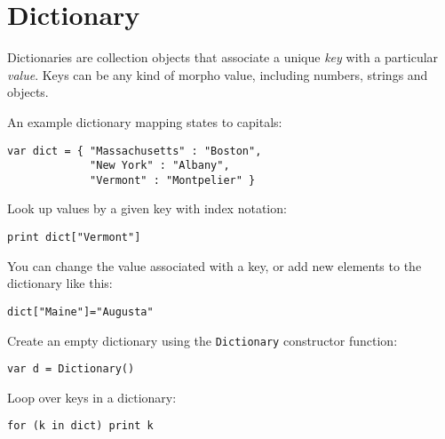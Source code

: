 \hypertarget{dictionary}{%
\section{Dictionary}\label{dictionary}}

Dictionaries are collection objects that associate a unique \emph{key}
with a particular \emph{value}. Keys can be any kind of morpho value,
including numbers, strings and objects.

An example dictionary mapping states to capitals:

\begin{lstlisting}
var dict = { "Massachusetts" : "Boston",
             "New York" : "Albany",
             "Vermont" : "Montpelier" }
\end{lstlisting}

Look up values by a given key with index notation:

\begin{lstlisting}
print dict["Vermont"]
\end{lstlisting}

You can change the value associated with a key, or add new elements to
the dictionary like this:

\begin{lstlisting}
dict["Maine"]="Augusta"
\end{lstlisting}

Create an empty dictionary using the \texttt{Dictionary} constructor
function:

\begin{lstlisting}
var d = Dictionary()
\end{lstlisting}

Loop over keys in a dictionary:

\begin{lstlisting}
for (k in dict) print k
\end{lstlisting}
